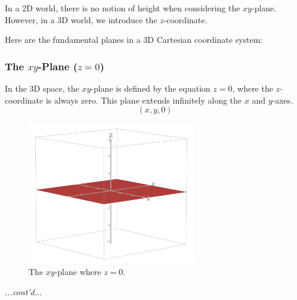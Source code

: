 \documentclass{article}
\begin{document}
\begin{conceptbox}
In a 2D world, there is no notion of height when considering the \( xy \)-plane. However, in a 3D world, we introduce the \( z \)-coordinate. 

Here are the fundamental planes in a 3D Cartesian coordinate system:

\begin{blankbox}
\subsubsection*{The \( xy \)-Plane (\( z = 0 \))}
In the 3D space, the \( xy \)-plane is defined by the equation \( z = 0 \), where the \( z \)-coordinate is always zero. This plane extends infinitely along the \( x \) and \( y \)-axes.
\[
    (x, y, 0)
\]
\begin{figure}[H]
    \centering
    \includegraphics[width=0.65\textwidth]{xy plane.png}
    \caption{The \( xy \)-plane where \( z = 0 \).}
    \label{fig:xy_plane}
\end{figure}
\end{blankbox}

\textit{...cont'd...}
\end{conceptbox}
\end{document}
